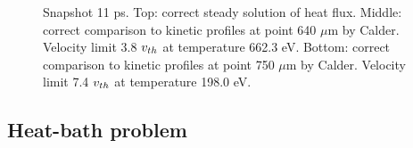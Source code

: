 \begin{figure}[tbh]
  \begin{center}
    \begin{tabular}{c}
    \end{tabular}
  \caption{  
  Snapshot 11 ps. Top: correct steady solution of heat flux.  
  Middle: correct comparison to kinetic profiles at point 640 $\mu$m by Calder. 
  Velocity limit 3.8 $v_{th}$ at temperature 662.3 eV.
  Bottom: correct comparison to kinetic profiles at point 750 $\mu$m by Calder.
  Velocity limit 7.4 $v_{th}$ at temperature 198.0 eV.
  }
  \label{fig:C7_Calder_case1}
  \end{center} 
\end{figure}

\subsection{Heat-bath problem}  
\label{sec:heatbath_test}

